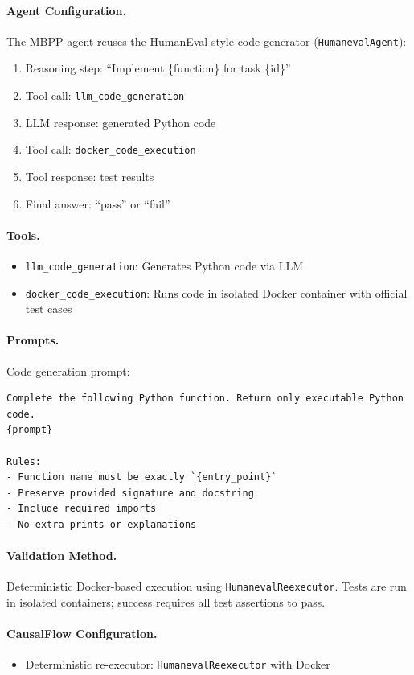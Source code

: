 \documentclass{article}
\theoremstyle{plain}
\theoremstyle{definition}
\theoremstyle{remark}
\begin{document}
\paragraph{Agent Configuration.}
The MBPP agent reuses the HumanEval-style code generator (\texttt{HumanevalAgent}):
\begin{enumerate}
    \item Reasoning step: ``Implement \{function\} for task \{id\}''
    \item Tool call: \texttt{llm\_code\_generation}
    \item LLM response: generated Python code
    \item Tool call: \texttt{docker\_code\_execution}
    \item Tool response: test results
    \item Final answer: ``pass'' or ``fail''
\end{enumerate}

\paragraph{Tools.}
\begin{itemize}
    \item \texttt{llm\_code\_generation}: Generates Python code via LLM
    \item \texttt{docker\_code\_execution}: Runs code in isolated Docker container with official test cases
\end{itemize}

\paragraph{Prompts.}
Code generation prompt:
\begin{verbatim}
Complete the following Python function. Return only executable Python code.
{prompt}

Rules:
- Function name must be exactly `{entry_point}`
- Preserve provided signature and docstring
- Include required imports
- No extra prints or explanations
\end{verbatim}

\paragraph{Validation Method.}
Deterministic Docker-based execution using \texttt{HumanevalReexecutor}. Tests are run in isolated containers; success requires all test assertions to pass.

\paragraph{CausalFlow Configuration.}
\begin{itemize}
    \item Deterministic re-executor: \texttt{HumanevalReexecutor} with Docker
\end{itemize}
\end{document}
